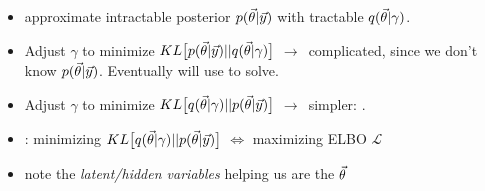 \documentclass[11pt]{article}
\begin{document}
\begin{itemize}
  \item approximate intractable posterior $p(\vec{\theta} | \vec{y})$ with tractable
  $q(\vec{\theta} | \gamma)$.
  \item Adjust $\gamma$ to minimize
  $KL \big[p(\vec{\theta} | \vec{y}) || q(\vec{\theta} | \gamma)\big]$ $\to\,$ complicated,
  since we don't know $p(\vec{\theta} | \vec{y})$. Eventually will use  to solve.
  \item Adjust $\gamma$ to minimize
  $KL \big[q(\vec{\theta} | \gamma) || p(\vec{\theta} | \vec{y})\big]$ $\to\,$ simpler:
  .
  \item {}: minimizing
  $KL \big[q(\vec{\theta} | \gamma) || p(\vec{\theta} | \vec{y})\big]$ $\iff$ maximizing ELBO
  $\mathcal{L}$
  \item note the \emph{latent/hidden variables} helping us are the $\vec{\theta}$
\end{itemize}
\end{document}
